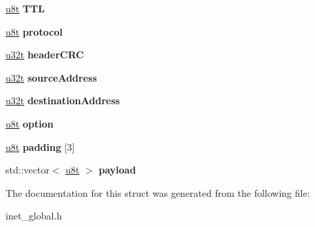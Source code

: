 \begin{DoxyCompactItemize}
\hyperlink{macros_8h_a176a4ab0531a048e0693a4520c550193}{u8t} {\bfseries T\+TL}
\item 
\mbox{\label{structipv4__header__t_abcb115504415c8546c24394f44037f5f}} 
\hyperlink{macros_8h_a176a4ab0531a048e0693a4520c550193}{u8t} {\bfseries protocol}
\item 
\mbox{\label{structipv4__header__t_a056f1d4b637c9ac36f326690ab584ab3}} 
\hyperlink{macros_8h_a464a07ed2c6d005d677113cc44750a64}{u32t} {\bfseries header\+C\+RC}
\item 
\mbox{\label{structipv4__header__t_ade49e0bd0402fafc2f94d31277ebe6e3}} 
\hyperlink{macros_8h_a464a07ed2c6d005d677113cc44750a64}{u32t} {\bfseries source\+Address}
\item 
\mbox{\label{structipv4__header__t_a2b746f34fa839a18b548f8b950fdab61}} 
\hyperlink{macros_8h_a464a07ed2c6d005d677113cc44750a64}{u32t} {\bfseries destination\+Address}
\item 
\mbox{\label{structipv4__header__t_a86340594c0fd6d27fe9bbeeb129f31f2}} 
\hyperlink{macros_8h_a176a4ab0531a048e0693a4520c550193}{u8t} {\bfseries option}
\item 
\mbox{\label{structipv4__header__t_a3e5bb6d694e89999c96e42576d7a052b}} 
\hyperlink{macros_8h_a176a4ab0531a048e0693a4520c550193}{u8t} {\bfseries padding} \mbox{[}3\mbox{]}
\item 
\mbox{\label{structipv4__header__t_a6cb0f06ef984e798b7bfe4eeb11fa4d9}} 
std\+::vector$<$ \hyperlink{macros_8h_a176a4ab0531a048e0693a4520c550193}{u8t} $>$ {\bfseries payload}
\end{DoxyCompactItemize}


The documentation for this struct was generated from the following file\+:\begin{DoxyCompactItemize}
\item 
inet\+\_\+global.\+h\end{DoxyCompactItemize}
